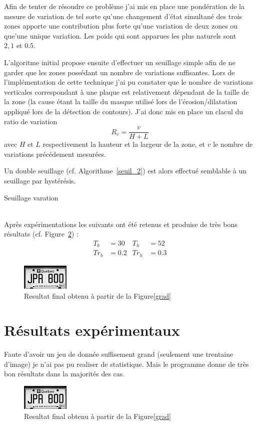 \documentclass[a4paper,10pt,twocolumn]{article}
\begin{document}
Afin de tenter de résoudre ce problème j'ai mis en place une pondération de la mesure de variation de tel sorte qu'une changement d'état simultané des trois zones apporte une contribution plus forte qu'une variation de deux zones ou que'une unique variation. Les poids qui sont apparues les plus naturels sont $2, 1 \text{ et } 0.5$.

L'algoritme initial propose ensuite d'effectuer un seuillage simple afin de ne garder que les zones possédant un nombre de variations suffisantes. Lors de l'implémentation de cette technique j'ai pu constater que le nombre de variations verticales correspondant à une plaque est relativement dépendant de la taille de la zone (la cause étant la taille du masque utilisé lors de l'érosion/dilatation appliqué lors de la détection de contours). J'ai donc mis en place un clacul du ratio de variation
\begin{equation}
  R_v = \frac{v}{H+L}
\end{equation}
avec $H \text{ et } L$ respectivement la hauteur et la largeur de la zone, et $v$ le nombre de variations précédement mesurées.

Un double seuillage (cf. Algorithme~\ref{seuil_2}) est alors effectué semblable à un seuillage par hystérésis.
\begin{algorithm} 
	\caption{Seuillage varation\label{seuil_2}}
	
\end{algorithm}\\
Après expérimentations les suivants ont été retenus et produise de très bons résultats (cf. Figure~\ref{plate}) :
\begin{align*}
  T_b &= 30 &T_h &= 52\\
  Tr_b &= 0.2 &Tr_h &= 0.3
\end{align*}
\begin{figure}[H]
	\centering 
	  \includegraphics{img/plate.png}
	\caption{Resultat final obtenu à partir de la Figure\ref{grad}\label{plate}}
\end{figure}

\section{Résultats expérimentaux}
Faute d'avoir un jeu de donnée suffisement grand (seulement une trentaine d'image) je n'ai pas pu realiser de statistique. Mais le programme donne de très bon résultats dans la majorités des cas.
\begin{figure}[H]
	\centering 
	  \includegraphics{img/plate.png}
	\caption{Resultat final obtenu à partir de la Figure\ref{grad}\label{plate}}
\end{figure}
\end{document}
